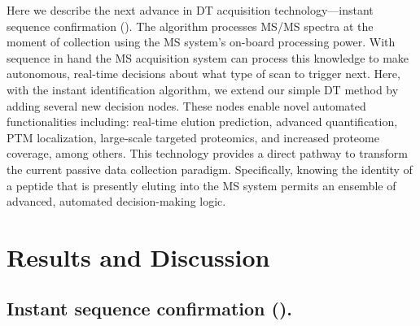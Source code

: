 Here we describe the next advance in DT acquisition technology---instant sequence confirmation (\inseq{}). The \inseq{} algorithm processes MS/MS spectra at the moment of collection using the MS system's on-board processing power. With sequence in hand the MS acquisition system can process this knowledge to make autonomous, real-time decisions about what type of scan to trigger next. Here, with the \inseq{} instant identification algorithm, we extend our simple DT method by adding several new decision nodes. These nodes enable novel automated functionalities including: real-time elution prediction, advanced quantification, PTM localization, large-scale targeted proteomics, and increased proteome coverage, among others. This technology provides a direct pathway to transform the current passive data collection paradigm. Specifically, knowing the identity of a peptide that is presently eluting into the MS system permits an ensemble of advanced, automated decision-making logic.

\section{Results and Discussion}

\subsection*{Instant sequence confirmation (\inseq{}).}

